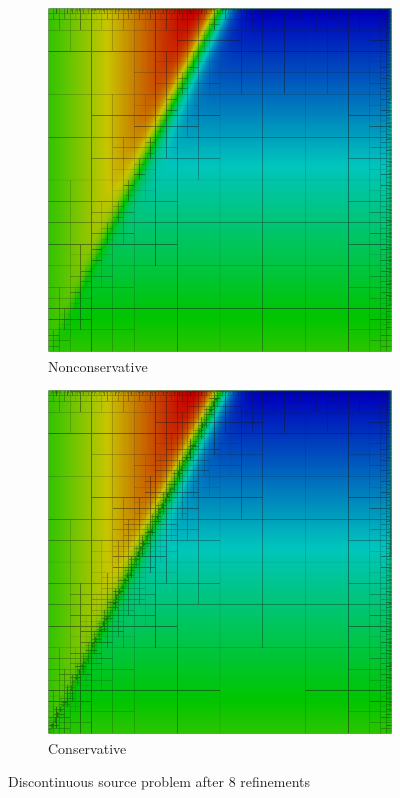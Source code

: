 \documentclass[letterpaper]{article}
\begin{document}
\begin{figure}[p]
\centering
\begin{subfigure}[t]{0.45\textwidth}
\centering
\includegraphics[width=\textwidth]{figs/Discontinuous/graph8nc.png}
\caption{Nonconservative}
\label{fig:discontinuousModified8nc}
\end{subfigure}
\begin{subfigure}[t]{0.45\textwidth}
\centering
\includegraphics[width=\textwidth]{figs/Discontinuous/robust8nc.png}
\caption{Conservative}
\label{fig:discontinuousModified8c}
\end{subfigure}
\caption{Discontinuous source problem after 8 refinements}
\label{fig:discontinuous}
\end{figure}
\end{document}
